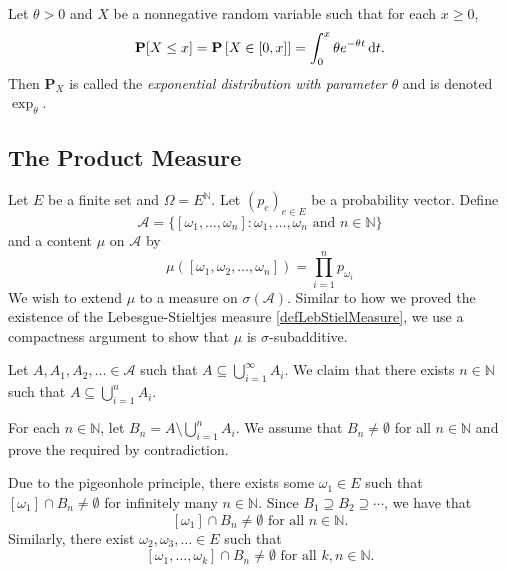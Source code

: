 \begin{enumerate}
    Let $\theta>0$ and $X$ be a nonnegative random variable such that for each $x\geq 0$,
    $$\textbf{P}[X\leq x]=\textbf{P}\left[X\in[0,x]\right]=\int_{0}^x\theta e^{-\theta t}\operatorname{d}\!{t}.$$
    Then $\textbf{P}_X$ is called the \textit{exponential distribution with parameter $\theta$} and is denoted $\exp_\theta$.
    
    
    
\end{enumerate}

\subsection{The Product Measure}

Let $E$ be a finite set and $\Omega=E^\mathbb{N}$. Let $(p_e)_{e\in E}$ be a probability vector. Define
$$\mathcal{A}=\{[\omega_1,\ldots,\omega_n]:\omega_1,\ldots,\omega_n\text{ and }n\in\mathbb{N}\}$$
and a content $\mu$ on $\mathcal{A}$ by
$$\mu([\omega_1,\omega_2,\ldots,\omega_n])=\prod_{i=1}^n p_{\omega_i}$$
We wish to extend $\mu$ to a measure on $\sigma(\mathcal{A})$. Similar to how we proved the existence of the Lebesgue-Stieltjes measure \cref{defLebStielMeasure}, we use a compactness argument to show that $\mu$ is $\sigma$-subadditive.

Let $A,A_1,A_2,\ldots\in\mathcal{A}$ such that $A\subseteq\bigcup_{i=1}^\infty A_i$. We claim that there exists $n\in\mathbb{N}$ such that $A\subseteq\bigcup_{i=1}^n A_i.$

For each $n\in\mathbb{N}$, let $B_n=A\setminus\bigcup_{i=1}^n A_i$. We assume that $B_n\neq\emptyset$ for all $n\in\mathbb{N}$ and prove the required by contradiction.

Due to the pigeonhole principle, there exists some $\omega_1\in E$ such that $[\omega_1]\cap B_n\neq\emptyset$ for infinitely many $n\in\mathbb{N}$. Since $B_1\supseteq B_2\supseteq\cdots$, we have that
$$[\omega_1]\cap B_n\neq\emptyset\text{ for all }n\in\mathbb{N}.$$
Similarly, there exist $\omega_2,\omega_3,\ldots\in E$ such that
$$[\omega_1,\ldots,\omega_k]\cap B_n\neq\emptyset\text{ for all }k,n\in\mathbb{N}.$$

